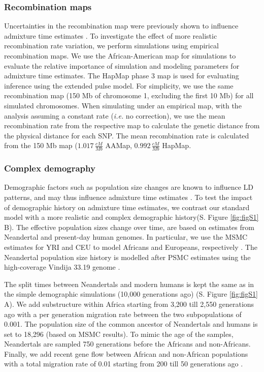 \documentclass[11pt]{article}
\begin{document}
\subsubsection{Recombination maps}\label{recombination map}
Uncertainties in the recombination map were previously shown to influence admixture time estimates \citep{sankararaman_date_2012,fu_genome_2014,sankararaman_combined_2016}. To investigate the effect of more realistic
recombination rate variation, we perform simulations using empirical recombination maps. We use the  African-American map \citep{hinch_landscape_2011} for simulations to evaluate the relative importance of simulation and modeling parameters for admixture time estimates. The HapMap phase 3 map \citep{HapMapConsortium_second_2007} is used for evaluating inference using the extended pulse model. For simplicity, we use the same
recombination map (150 Mb of chromosome 1, excluding the first 10 Mb)
for all simulated chromosomes. When simulating under an empirical map, with the analysis assuming a constant rate (\emph{i.e.} no correction), we use the mean recombination rate from the respective map to calculate the genetic distance from the physical distance for each SNP. The mean recombination rate is
calculated from the 150 Mb map (\(1.017 \, \frac{cM}{Mb}\) AAMap,
\(0.992 \, \frac{cM}{Mb}\) HapMap.



\subsubsection{Complex demography}\label{inferred demography}
Demographic factors such as population size changes are known to influence LD
patterns, and may thus influence admixture time estimates \citep{gravel_population_2012,liang_lengths_2014}. To test the impact of
demographic history on admixture time estimates, we contrast our standard model with a more 
realistic and complex demographic history(S. Figure \ref{fig:figS1} B). The effective population
sizes change over time, are based on estimates from Neandertal and present-day human genomes. In particular, we use the MSMC estimates for YRI and CEU to model Africans and Europeans, respectively 
\citep{schiffels_inferring_2014}. The Neandertal population size history is modelled after  PSMC estimates \citep{li_inference_2011} using the high-coverage Vindija 33.19 genome
\citep{prufer_high-coverage_2017}. 

The split times between Neandertals and
modern humans is kept the
same as in the simple demographic simulations (10,000 generations ago) (S. Figure  \ref{fig:figS1} A). We add substructure within Africa starting from 3,200 till 2,550 generations ago with a per generation migration rate between the two subpopulations of 0.001. The population size of the common ancestor of Neandertals and humans  is set to 18,296 (based on MSMC results). To mimic the age of the samples, Neandertals are sampled 750 generations before the Africans and non-Africans. Finally, we add recent gene flow between African and non-African populations with a total migration rate of 0.01 starting from 200 till 50 generations ago \citep{petr_limits_2019}.
\end{document}
